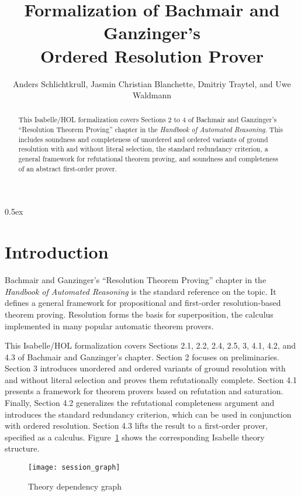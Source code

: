 \documentclass[10pt,a4paper]{article}
\begin{document}
\title{Formalization of Bachmair and Ganzinger's \\ Ordered Resolution Prover}
\author{Anders Schlichtkrull, Jasmin Christian Blanchette, Dmitriy Traytel, and Uwe Waldmann}

\maketitle

\begin{abstract}
\noindent
This Isabelle/HOL formalization covers Sections 2 to 4 of Bachmair and
Ganzinger's ``Resolution Theorem Proving'' chapter
\cite{bachmair-ganzinger-2001} in the \emph{Handbook of Automated Reasoning}.
This includes soundness and completeness of unordered and ordered variants of
ground resolution with and without literal selection, the standard redundancy
criterion, a general framework for refutational theorem proving, and soundness
and completeness of an abstract first-order prover.
\end{abstract}

\tableofcontents

\parindent 0pt
\parskip 0.5ex

\section{Introduction}

Bachmair and Ganzinger's ``Resolution Theorem Proving'' chapter
\cite{bachmair-ganzinger-2001} in the \emph{Handbook of Automated Reasoning}
is the standard reference on the topic. It defines a general framework for
propositional and first-order resolution-based theorem proving. Resolution
forms the basis for superposition, the calculus implemented in many popular
automatic theorem provers.

\medskip

This Isabelle/HOL formalization covers Sections 2.1, 2.2, 2.4, 2.5, 3, 4.1,
4.2, and 4.3 of Bachmair and Ganzinger's chapter. Section 2 focuses on
preliminaries. Section 3 introduces unordered and ordered variants of ground
resolution with and without literal selection and proves them refutationally
complete. Section 4.1 presents a framework for theorem provers based on
refutation and saturation. Finally, Section 4.2 generalizes the refutational
completeness argument and introduces the standard redundancy criterion, which
can be used in conjunction with ordered resolution. Section 4.3 lifts the
result to a first-order prover, specified as a calculus. Figure~\ref{fig:thys}
shows the corresponding Isabelle theory structure.

\begin{figure}
\begin{center}
  \texttt{[image: session\_graph]}
\end{center}
\caption{Theory dependency graph}
\label{fig:thys}
\end{figure}



%
%



\end{document}
